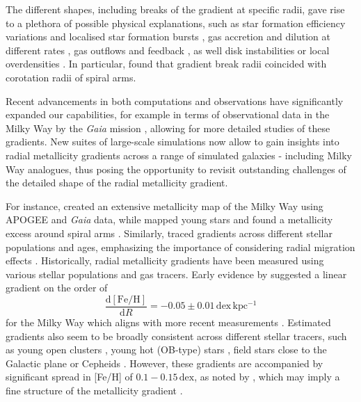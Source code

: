 \documentclass[fleqn,usenatbib]{mnras}
\begin{document}
The different shapes, including breaks of the gradient at specific radii, gave rise to a plethora of possible physical explanations, such as star formation efficiency variations and localised star formation bursts \citep{Sanchez2014, SanchezBlazquez2014, Ho2015}, gas accretion and dilution at different rates \citep{Bresolin2012, Sanchez2013, Belfiore2016, SanchezMenguiano2016}, gas outflows and feedback \citep{Lilly2013, Ma2017b}, as well disk instabilities or local overdensities \citep{Grand2016, Ho2017c}. In particular, \citet{Scarano2013} found that gradient break radii coincided with corotation radii of spiral arms.

Recent advancements in both computations and observations have significantly expanded our capabilities, for example in terms of observational data in the Milky Way by the \textit{Gaia} mission \citep{Gaia-Collaboration2016}, allowing for more detailed studies of these gradients. New suites of large-scale simulations now allow to gain insights into radial metallicity gradients across a range of simulated galaxies - including Milky Way analogues, thus posing the opportunity to revisit outstanding challenges of the detailed shape of the radial metallicity gradient.

For instance, \citet{Hogg2019} created an extensive metallicity map of the Milky Way using APOGEE and \textit{Gaia} data, while \citet{Poggio2022} mapped young stars and found a metallicity excess around spiral arms \citep[see also][]{Zari2018, Zari2021, Poggio2021, Hackshaw2024}. Similarly, \citet[][among others]{Imig2023} traced gradients across different stellar populations and ages, emphasizing the importance of considering radial migration effects \citep{Binney2008, Frankel2018, Frankel2020}. Historically, radial metallicity gradients have been measured using various stellar populations and gas tracers. Early evidence by \citet{Janes1979} suggested a linear gradient on the order of
\begin{equation}
\frac{\mathrm{d{[Fe/H]}}}{\mathrm{d}R} = -0.05 \pm 0.01\,\mathrm{dex\,kpc^{-1}}
\end{equation}
for the Milky Way which aligns with more recent measurements \citep{Anders2017, Hayden2015}. Estimated gradients also seem to be broadly consistent across different stellar tracers, such as young open clusters \citep[e.g.][]{Yong2012, Cunha2016, Magrini2017, Casamiquela2019, Donor2020, Spina2021,Myers2022}, young hot (OB-type) stars \citep{Zari2018, Zari2021, Poggio2021, Poggio2022}, field stars close to the Galactic plane \citep[e.g.][]{Bergemann2014} or Cepheids \citep{Andrievsky2002, Andrievsky2002b, Lemasle2007, Lemasle2013}. However, these gradients are accompanied by significant spread in [Fe/H] of $0.1-0.15\,\mathrm{dex}$, as noted by \citet{Twarog1980}, which may imply a fine structure of the metallicity gradient \citep[see][]{Genovali2014}.
\end{document}
